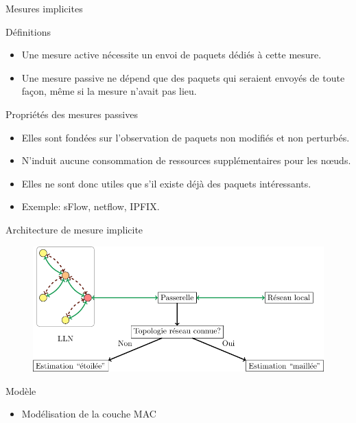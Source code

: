 \begin{frame}{Mesures implicites}
  \begin{block}{Définitions}
    \begin{itemize}
      \item Une mesure active nécessite un envoi de paquets dédiés à cette mesure.
      \item Une mesure passive ne dépend que des paquets qui seraient envoyés de toute façon, même si la mesure n'avait pas lieu.
    \end{itemize}
  \end{block}
  \begin{block}{Propriétés des mesures passives}
    \begin{itemize}
      \item Elles sont fondées sur l'observation de paquets non modifiés et non perturbés.
      \item N'induit aucune consommation de ressources supplémentaires pour les nœuds.
      \item Elles ne sont donc utiles que s'il existe déjà des paquets intéressants.
      \item Exemple: sFlow, netflow, IPFIX.
    \end{itemize}

  \end{block}

\end{frame}

\begin{frame}{Architecture de mesure implicite}
  \begin{figure}
    \centering
    \includegraphics[width=\textwidth]{figures/schema_supervision_slides.pdf}
  \end{figure}
  \begin{block}{Modèle}
    \begin{itemize}
      \item Modélisation de la couche MAC
    \end{itemize}
  \end{block}
\end{frame}

